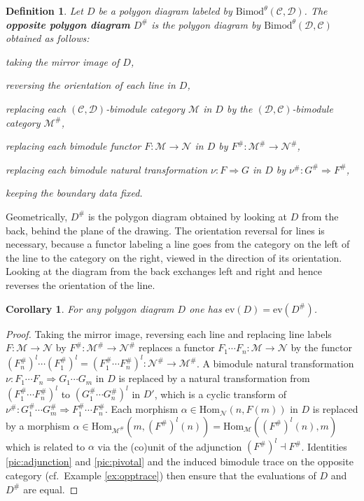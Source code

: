 \documentclass[1.5pt, a4paper]{article}
\newcommand{\mac}{\mathcal C}
\newcommand{\mad}{\mathcal D}
\newcommand{\mam}{\mathcal M}
\newcommand{\man}{\mathcal N}
\newcommand{\Hom}{\mathrm{Hom}}
\newcommand{\Bimod}{\mathrm{Bimod}}
\newtheorem{corollary}[theorem]{Corollary}
\newtheorem{definition}[theorem]{Definition}
\begin{document}
\begin{definition}\label{def:oppoly} Let $D$ be a polygon diagram  labeled by $\Bimod^{\theta}(\mac,\mad)$. 
 The {\bf opposite polygon diagram} $D^\#$ is the  polygon diagram by $\Bimod^{\theta}(\mad,\mac)$ obtained as follows:
 \begin{compactitem}
\item  taking the mirror image of $D$, 
\item reversing the orientation of each line in $D$, 
\item replacing each  $(\mac,\mad)$-bimodule category $\mam$ in $D$  by the 
$(\mad,\mac)$-bimodule category $\mam^\#$, 
\item replacing each bimodule functor $F:\mam\to\man$ in $D$ by  $F^\#:\mam^\#\to\man^\#$,
\item replacing  each bimodule natural transformation $\nu: F\Rightarrow G$ in $D$ by  $\nu^\#: G^\#\Rightarrow F^\#$,
\item  keeping the boundary data fixed.
\end{compactitem}
\end{definition}

Geometrically, $D^\#$ is the polygon diagram obtained by looking at $D$ from the back, behind the plane of the drawing. The orientation reversal for lines  is  necessary, because 
a functor labeling a line goes from the category on the left of the line to the category on the right, viewed in the direction of its orientation. Looking at the diagram from the back exchanges left and right and hence reverses the orientation of the line.



\begin{corollary}\label{rem:polyback}
For any polygon diagram $D$ one has $\mathrm{ev}(D)=\mathrm{ev}(D^\#)$.
\end{corollary}
\begin{proof}
Taking the mirror image, reversing each line and replacing  line labels $F:\mam\to\man$ by $F^\#:\mam^\#\to \man^\#$ replaces a functor $F_1\cdots F_n: \mam\to\man$   by the  functor $(F_n^\#)^l\cdots (F_1^\#)^l=(F_1^\#\cdots F_n^\#)^l: \man^\#\to\mam^\#$. A bimodule natural transformation $\nu: F_1\cdots F_n\Rightarrow G_1\cdots G_m$ in $D$ is replaced by  a natural transformation from $(F_1^\#\cdots F_n^\#)^l$ to $(G_1^\#\cdots G_n^\#)^l$ in $D'$, which is a cyclic transform of $\nu^\#: G_1^\#\cdots G_m^\#\Rightarrow F_1^\#\cdots F_n^\#$. Each morphism $\alpha\in \Hom_\man(n,F(m))$ in $D$ is replaced by a  morphism  $\alpha\in \Hom_{\mam^\#}(m, (F^\#)^l(n))=\Hom_\mam((F^\#)^l(n), m)$ which is related to $\alpha$ via the (co)unit of the adjunction $(F^\#)^l\dashv F^\#$. Identities \eqref{pic:adjunction} and \eqref{pic:pivotal} and the induced bimodule trace on the opposite category (cf.~Example \ref{ex:opptrace}) then ensure that the evaluations of $D$ and $D^\#$ are equal.
\end{proof}
\end{document}
